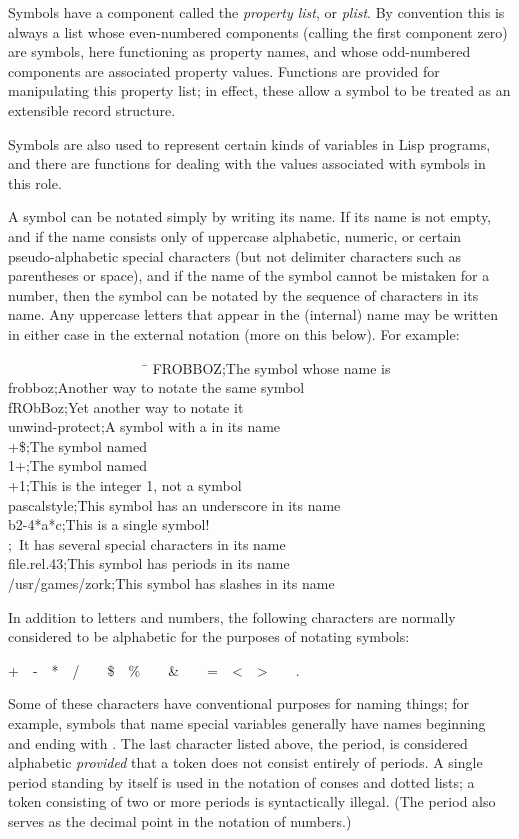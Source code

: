 {Symbols have a component called the {\it property list}, or {\it plist}.
By convention this is always a list whose even-numbered
components (calling the first component zero) are symbols,
here functioning as property names, and whose odd-numbered components
are associated property values.  Functions are provided for manipulating
this property list; in effect, these allow a symbol to be treated as an
extensible record structure.

Symbols are also used to represent certain kinds of variables in Lisp
programs, and there are functions for dealing with the values associated
with symbols in this role.

A symbol can be notated simply by writing its name.
If its name is not empty, and if the name consists only of
uppercase alphabetic, numeric, or certain pseudo-alphabetic
special characters (but not
delimiter characters such as parentheses or space), and if
the name of the symbol cannot be mistaken for a number, then
the symbol can be notated by the sequence of characters in its name.
Any uppercase letters that appear in the (internal) name may
be written in either case in the external notation (more on this below).
For example:
\begin{lisp}
~~~~~~~~~~~~~~~~~~~~\=\kill
FROBBOZ\>;{\rm The symbol whose name is } \\
frobboz\>;{\rm Another way to notate the same symbol} \\
fRObBoz\>;{\rm Yet another way to notate it} \\
unwind-protect\>;{\rm A symbol with a \cd{-} in its name} \\
+\$\>;{\rm The symbol named \cd{+\$}} \\
1+\>;{\rm The symbol named } \\
+1\>;{\rm This is the integer 1, not a symbol} \\
pascal{\Xunderscore}style\>;{\rm This symbol has an underscore in its name} \\
b{\Xcircumflex}2-4*a*c\>;{\rm This is a single symbol!} \\
\>;~{\rm It has several special characters in its name} \\
file.rel.43\>;{\rm This symbol has periods in its name} \\
/usr/games/zork\>;{\rm This symbol has slashes in its name}
\end{lisp}
In addition to letters and numbers, the following characters are normally
considered to be alphabetic for the purposes of notating
symbols:
\begin{lisp}
+~~-~~*~~/~~{\Xatsign}~~\$~~\%~~{\Xcircumflex}~~\&~~{\Xunderscore}~~=~~<~~>~~{\Xtilde}~~.
\end{lisp}
Some of these characters have conventional purposes for naming things;
for example, symbols that name special variables
generally have names beginning and ending with
\cd{*}.  The last character listed above, the period, is considered alphabetic
{\it provided} that a token does not consist entirely of periods.
A single period standing by itself is used in the notation
of conses and dotted lists; a token consisting of two or more periods
is syntactically illegal.  (The period also serves as the decimal point
in the notation of numbers.)

}

